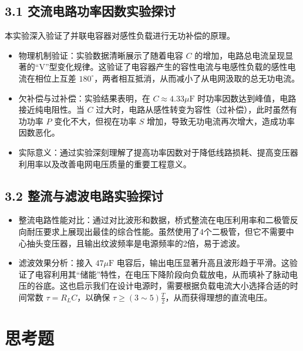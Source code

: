 \documentclass[]{../template/Report}%
\begin{document}
\begin{fullreportonly}
\subsection{3.1 交流电路功率因数实验探讨}
本实验深入验证了并联电容器对感性负载进行无功补偿的原理。
\begin{itemize}
    \item 物理机制验证：实验数据清晰展示了随着电容 $C$ 的增加，电路总电流呈现显著的“V”型变化规律。这验证了电容器产生的容性电流与电感性负载的感性电流在相位上互差 $180^\circ$，两者相互抵消，从而减小了从电网汲取的总无功电流。
    \item 欠补偿与过补偿：实验结果表明，在 $C \approx 4.33\mu\text{F}$ 时功率因数达到峰值，电路接近纯电阻性。当 $C$ 过大时，电路从感性转变为容性（过补偿），此时虽然有功功率 $P$ 变化不大，但视在功率 $S$ 增加，导致无功电流再次增大，造成功率因数恶化。
    \item 实际意义：通过实验深刻理解了提高功率因数对于降低线路损耗、提高变压器利用率以及改善电网电压质量的重要工程意义。
\end{itemize}

\subsection{3.2 整流与滤波电路实验探讨}
\begin{itemize}
    \item 整流电路性能对比：通过对比波形和数据，桥式整流在电压利用率和二极管反向耐压要求上展现出最佳的综合性能。虽然使用了4个二极管，但它不需要中心抽头变压器，且输出纹波频率是电源频率的2倍，易于滤波。
    \item 滤波效果分析：接入 $47\mu\text{F}$ 电容后，输出电压显著升高且波形趋于平滑。这验证了电容利用其“储能”特性，在电压下降阶段向负载放电，从而填补了脉动电压的谷底。这也启示我们在设计电源时，需要根据负载电流大小选择合适的时间常数 $\tau = R_L C$，以确保 $\tau \geq (3\sim5) \frac{T}{2}$，从而获得理想的直流电压。
\end{itemize}

\section{思考题}


\end{fullreportonly}
\end{document}
